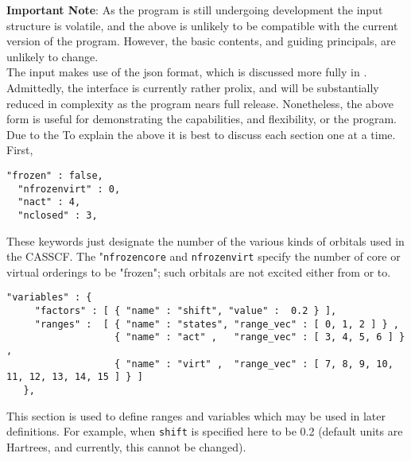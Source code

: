 \noindent \textbf{Important Note}: As the program is still undergoing development the
input structure is volatile, and the above is unlikely to be compatible with
the current version of the program. However, the basic contents, and guiding principals,
are unlikely to change.\\

\noindent The input makes use of the json format, which is discussed more fully in  \cite{JSON}.
Admittedly, the interface is currently rather prolix, and will be substantially reduced in complexity
as the program nears full release. Nonetheless, the above form is useful for demonstrating the capabilities,
and flexibility, or the program. \\

\noindent Due to the  To explain the above it is best to discuss each section one at a time. First,
\begin{lstlisting}[label={lst:casscf}]
  "frozen" : false,
  "nfrozenvirt" : 0,
  "nact" : 4,
  "nclosed" : 3,
\end{lstlisting}         
\noindent These keywords just designate the number of the various kinds of orbitals used in the CASSCF.
The "\texttt{nfrozencore} and \texttt{nfrozenvirt} specify the number of core or virtual orderings to be "frozen";
such orbitals are not excited either from or to.\\

\begin{lstlisting}[label={lst:variables}]
  "variables" : {
     "factors" : [ { "name" : "shift", "value" :  0.2 } ],
     "ranges" :  [ { "name" : "states", "range_vec" : [ 0, 1, 2 ] } ,
                   { "name" : "act" ,   "range_vec" : [ 3, 4, 5, 6 ] } ,
                   { "name" : "virt" ,  "range_vec" : [ 7, 8, 9, 10, 11, 12, 13, 14, 15 ] } ]
   },
\end{lstlisting}         
\noindent This section is used to define ranges and variables which may be used in later definitions. For example,
when \texttt{shift} is specified here to be 0.2 (default units are Hartrees, and currently, this cannot be 
changed). 

